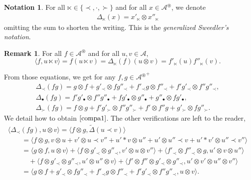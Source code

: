 \documentclass[pdftex]{sigma}
\numberwithin{equation}{section}
\theoremstyle{definition}
\newtheorem{Rq}[defi]{Remark}
\newtheorem{Not}[defi]{Notation}
\theoremstyle{plain}
\begin{document}
\begin{Not}
	 For all $\ltimes\in\{\prec,\cdot,\succ\}$ and for all $x\in \mathcal{A}^{\circledast}$, we denote
\begin{align*}
	\Delta_{\ltimes}(x)=x'_{\ltimes}\otimes x''_{\ltimes}
\end{align*}
omitting the sum to shorten the writing. This is the \emph{generalized Sweedler's notation}.
\end{Not}
\begin{Rq}
	For all $f\in \mathcal{A}^{\circledast}$ and for all $u,v\in \mathcal{A}$,
	\[
	 \langle f,u\ltimes v \rangle=f(u\ltimes v)=\Delta_{\ltimes}(f)(u\otimes v)=f'_{\ltimes}(u)f''_{\ltimes}(v).
	\]
\end{Rq}

From those equations, we get for any $f,g\in {\mathcal{A}^{\circledast}}^+$
\begin{gather}
	\Delta_{\prec}(fg)=g\otimes f+ g'_{\prec}\otimes fg''_{\prec}+f'_{\prec}g\otimes f''_{\prec}+f'g'_{\prec}\otimes f''g''_{\prec}, \label{compa1} \\
	\Delta_{\bullet}(fg)=f'g'_{\bullet}\otimes f''g''_{\bullet}+fg'_{\bullet}\otimes g''_{\bullet} + g''_{\bullet}\otimes fg'_{\bullet}, \label{compa2} \\
	\Delta_{\succ}(fg)=f\otimes g +f'g'_{\succ}\otimes f''g''_{\succ}+f'\otimes f''g+g'_{\succ}\otimes fg''_{\succ}. \label{compa3}	
\end{gather}
We detail how to obtain $\eqref{compa1}$. The other verifications are left to the reader,
\begin{gather*}
	\big\langle \Delta_{\prec}(fg),u\otimes v \big\rangle = \big\langle f\otimes g,\tilde\Delta(u\prec v) \big\rangle \\
	\qquad=\big\langle f\otimes g,v\otimes u+v'\otimes u\prec v''+u'*v\otimes u''+u'\otimes u''\prec v+u'*v'\otimes u''\prec v'' \big\rangle \\
	\qquad=\langle g\otimes f,u\otimes v \rangle+\big\langle f\otimes g'_{\prec}\otimes g''_{\prec}, v'\otimes u\otimes v'' \big\rangle+ \big\langle f'_{\prec}\otimes f''_{\prec}\otimes g,u'\otimes v\otimes u'' \big\rangle\\
	\qquad\quad+\big\langle f\otimes g'_{\prec} \otimes g''_{\prec},u'\otimes u''\otimes v \big\rangle+\big\langle f'\otimes f''\otimes g'_{\prec}\otimes g''_{\prec},u'\otimes v'\otimes u'' \otimes v'' \big\rangle \\
	\qquad= \big\langle g\otimes f+ g'_{\prec}\otimes fg''_{\prec}+f'_{\prec}g\otimes f''_{\prec}+f'g'_{\prec}\otimes f''g''_{\prec},u\otimes v \big\rangle.
\end{gather*}
\end{document}

